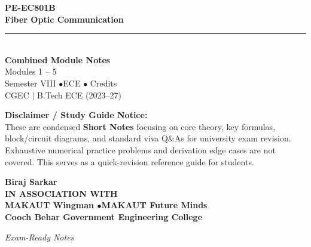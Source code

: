 \documentclass[12pt,a4paper]{article}
\begin{document}
\thispagestyle{empty}


\vspace*{1.0cm}
\begin{center}
  {\Huge\bfseries\color{myred} PE-EC801B}\\[10pt]
  {\LARGE\bfseries\color{mydark} Fiber Optic Communication}\\[20pt]
  {\color{myred}\rule{0.7\linewidth}{1.5pt}}\\[18pt]
  {\Large\color{myteal}\textbf{Combined Module Notes}}\\[8pt]
  {\large\color{mydark} Modules 1 -- 5}\\[40pt]
  {\normalsize\color{mydark} Semester VIII \quad$\bullet$\quad ECE \quad$\bullet$ Credits}\\[12pt]
  {\normalsize\color{mydark} CGEC \;$|$\; B.Tech ECE (2023--27)}
\end{center}
\vspace{1.0cm}
\begin{center}
  \begin{tcolorbox}[colback=mygray, colframe=mgframe, boxrule=0.5pt, arc=3pt, width=0.85\linewidth]
    \centering\small\color{mydark}
    \textbf{Disclaimer / Study Guide Notice:}\\
    These are condensed \textbf{Short Notes} focusing on core theory, key formulas, block/circuit diagrams, and standard viva Q\&As for university exam revision. Exhaustive numerical practice problems and derivation edge cases are not covered. This serves as a quick-revision reference guide for students.
  \end{tcolorbox}
\end{center}
\vfill
\vspace{0.6cm}
\begin{center}
  {\large\bfseries\color{mypurple} Biraj Sarkar}\\[16pt]
  {\footnotesize\color{watermark}\textbf{IN ASSOCIATION WITH}}\\[8pt]
  {\small\bfseries\color{mydark} MAKAUT Wingman \quad$\bullet$\quad MAKAUT Future Minds}\\[12pt]
  {\large\bfseries\color{myteal} Cooch Behar Government Engineering College}
\end{center}
\vfill
\begin{center}{\small\color{watermark}\textit{Exam-Ready Notes}}\end{center}
\clearpage
\end{document}
